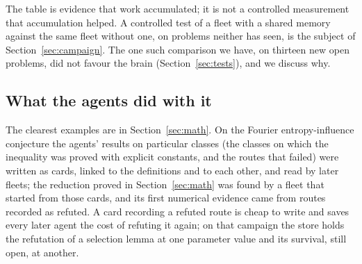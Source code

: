 The table is evidence that work accumulated; it is not a controlled measurement that accumulation helped. A controlled test of a fleet with a shared memory against the same fleet without one, on problems neither has seen, is the subject of Section~\ref{sec:campaign}. The one such comparison we have, on thirteen new open problems, did not favour the brain (Section~\ref{sec:tests}), and we discuss why.

\subsection{What the agents did with it}
The clearest examples are in Section~\ref{sec:math}. On the Fourier entropy-influence conjecture the agents' results on particular classes (the classes on which the inequality was proved with explicit constants, and the routes that failed) were written as cards, linked to the definitions and to each other, and read by later fleets; the reduction proved in Section~\ref{sec:math} was found by a fleet that started from those cards, and its first numerical evidence came from routes recorded as refuted. A card recording a refuted route is cheap to write and saves every later agent the cost of refuting it again; on that campaign the store holds the refutation of a selection lemma at one parameter value and its survival, still open, at another.
